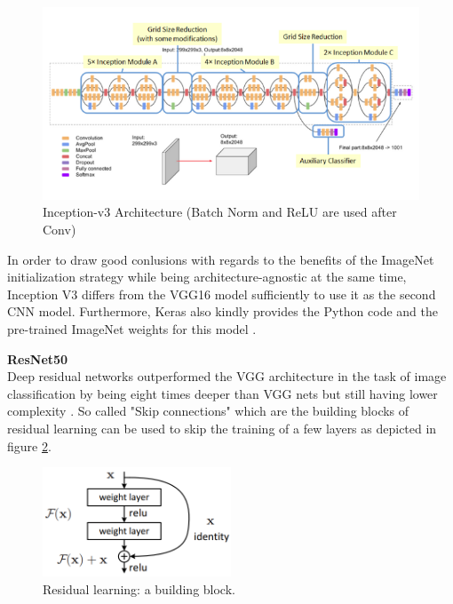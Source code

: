 \documentclass{article}
\theoremstyle{definition}
\theoremstyle{remark}
\begin{document}
\begin{figure}[h!]
    \centering
    \includegraphics[width=1\textwidth]{img/inception.png}
    \caption{Inception-v3 Architecture (Batch Norm and ReLU are used after Conv)}
    \label{fig:inception}
\end{figure}


In order to draw good conlusions with regards to the benefits of the ImageNet initialization strategy while being architecture-agnostic at the same time, Inception V3 differs from the VGG16 model sufficiently to use it as the second CNN model. Furthermore, Keras also kindly provides the Python code and the pre-trained ImageNet weights for this model \cite{inception}.\\
\newpage

\noindent\textbf{ResNet50}\\

Deep residual networks outperformed the VGG architecture in the task of image classification by being eight times deeper than VGG nets but still having lower complexity \cite{he2016deep}. So called "Skip connections" which are the building blocks of residual learning can be used to skip the training of a few layers as depicted in figure \ref{fig:skip_connection}.


\begin{figure}[h!]
    \centering
    \includegraphics[width=0.5\textwidth]{img/skip_connections.png}
    \caption{Residual learning: a building block.}
    \label{fig:skip_connection}
\end{figure}
\end{document}
